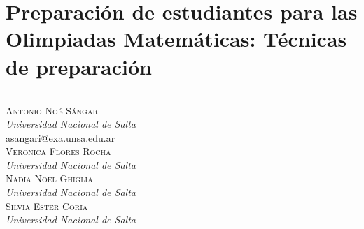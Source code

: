 \thispagestyle{portadapage}
\setcounter{subsection}{0}
\setcounter{subsubsection}{0}
\setcounter{actividad}{0}
\setcounter{actividad_previa}{0}
\setcounter{actividad_entre}{0}
\renewcommand{\articulotipo}{Taller}
\renewcommand{\articulotitulo}{Preparación de estudiantes para las Olimpiadas Matemáticas: Técnicas de preparación}
\renewcommand{\articulotitulocorto}{Preparación de estudiantes para las Olimpiadas Matemáticas: Técnicas de preparación}
\section{\articulotitulo}

\noindent\rule{\linewidth}{2pt}

\vspace{0.25cm}

\begin{flushright}
	{\Large \scshape
		Antonio Noé Sángari
	}\\
	{\large \itshape
		Universidad Nacional de Salta
	}\\
	{\ttfamily \small
		asangari@exa.unsa.edu.ar
	}\\
	\vspace{1em}
	{\Large \scshape
		Veronica Flores Rocha
	}\\
	{\large \itshape
		Universidad Nacional de Salta
	}\\
	\vspace{1em}
	{\Large \scshape
		Nadia Noel Ghiglia
	}\\
	{\large \itshape
		Universidad Nacional de Salta
	}\\
	\vspace{1em}
	{\Large \scshape
		Silvia Ester Coria
	}\\
	{\large \itshape
		Universidad Nacional de Salta
	}
\end{flushright}

\vspace{0.5cm}

